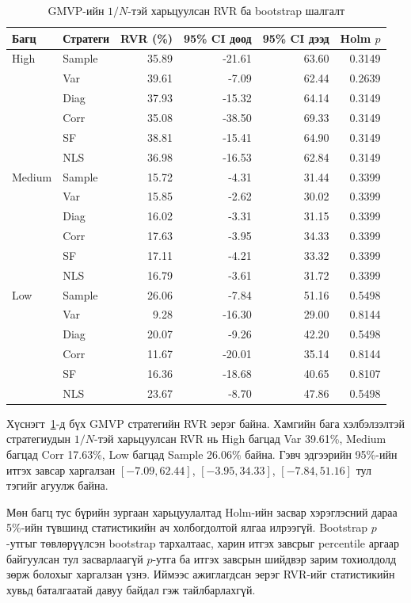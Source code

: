 \begin{table}[htbp]
	\centering
	\caption{GMVP-ийн $1/N$-тэй харьцуулсан RVR ба bootstrap шалгалт}
	\label{tab:bootstrap_equal_weight}
	\small
	\begin{tabular}{llrrrr}
		\hline
		Багц & Стратеги & RVR (\%) &
		95\% CI доод & 95\% CI дээд & Holm $p$ \\
		\hline
		High & Sample & 35.89 & -21.61 & 63.60 & 0.3149 \\
		& Var & 39.61 & -7.09 & 62.44 & 0.2639 \\
		& Diag & 37.93 & -15.32 & 64.14 & 0.3149 \\
		& Corr & 35.08 & -38.50 & 69.33 & 0.3149 \\
		& SF & 38.81 & -15.41 & 64.90 & 0.3149 \\
		& NLS & 36.98 & -16.53 & 62.84 & 0.3149 \\
		\hline
		Medium & Sample & 15.72 & -4.31 & 31.44 & 0.3399 \\
		& Var & 15.85 & -2.62 & 30.02 & 0.3399 \\
		& Diag & 16.02 & -3.31 & 31.15 & 0.3399 \\
		& Corr & 17.63 & -3.95 & 34.33 & 0.3399 \\
		& SF & 17.11 & -4.21 & 33.32 & 0.3399 \\
		& NLS & 16.79 & -3.61 & 31.72 & 0.3399 \\
		\hline
		Low & Sample & 26.06 & -7.84 & 51.16 & 0.5498 \\
		& Var & 9.28 & -16.30 & 29.00 & 0.8144 \\
		& Diag & 20.07 & -9.26 & 42.20 & 0.5498 \\
		& Corr & 11.67 & -20.01 & 35.14 & 0.8144 \\
		& SF & 16.36 & -18.68 & 40.65 & 0.8107 \\
		& NLS & 23.67 & -8.70 & 47.86 & 0.5498 \\
		\hline
	\end{tabular}
\end{table}

Хүснэгт~\ref{tab:bootstrap_equal_weight}-д
бүх GMVP стратегийн RVR эерэг байна.
Хамгийн бага хэлбэлзэлтэй стратегиудын
$1/N$-тэй харьцуулсан RVR нь High
багцад Var 39.61\%, Medium багцад
Corr 17.63\%, Low багцад Sample
26.06\% байна. Гэвч эдгээрийн
95\%-ийн итгэх завсар харгалзан
$[-7.09,62.44]$, $[-3.95,34.33]$,
$[-7.84,51.16]$ тул тэгийг агуулж байна.

Мөн багц тус бүрийн зургаан
харьцуулалтад Holm-ийн засвар
хэрэглэсний дараа 5\%-ийн түвшинд
статистикийн ач холбогдолтой ялгаа
илрээгүй. Bootstrap $p$-утгыг
төвлөрүүлсэн bootstrap тархалтаас,
харин итгэх завсрыг percentile
аргаар байгуулсан тул засварлаагүй
$p$-утга ба итгэх завсрын шийдвэр
зарим тохиолдолд зөрж болохыг
харгалзан үзнэ. Иймээс ажиглагдсан
эерэг RVR-ийг статистикийн хувьд
баталгаатай давуу байдал гэж
тайлбарлахгүй.

